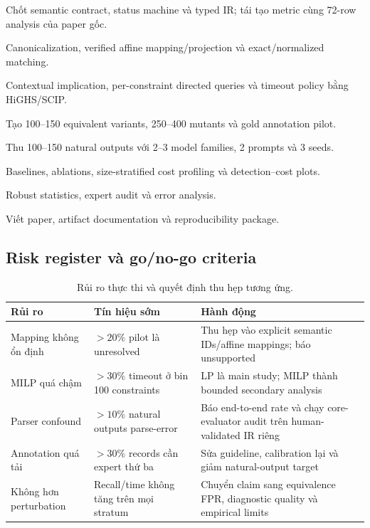 \documentclass[11pt,a4paper]{article}
\begin{document}
\begin{description}[leftmargin=2.3em,labelindent=0em,labelsep=0.5em,style=nextline]
  \item[\textbf{Tuần 1--2.}]
  Chốt semantic contract, status machine và typed IR; tái tạo metric cùng
  72-row analysis của paper gốc.

  \item[\textbf{Tuần 3--4.}]
  Canonicalization, verified affine mapping/projection và exact/normalized
  matching.

  \item[\textbf{Tuần 5--6.}]
  Contextual implication, per-constraint directed queries và timeout policy
  bằng HiGHS/SCIP.

  \item[\textbf{Tuần 7--8.}]
  Tạo 100--150 equivalent variants, 250--400 mutants và gold annotation pilot.

  \item[\textbf{Tuần 9.}]
  Thu 100--150 natural outputs với 2--3 model families, 2 prompts và 3 seeds.

  \item[\textbf{Tuần 10.}]
  Baselines, ablations, size-stratified cost profiling và detection--cost plots.

  \item[\textbf{Tuần 11.}]
  Robust statistics, expert audit và error analysis.

  \item[\textbf{Tuần 12.}]
  Viết paper, artifact documentation và reproducibility package.
\end{description}

\subsection{Risk register và go/no-go criteria}

\begin{table}[htbp]
\centering
\caption{Rủi ro thực thi và quyết định thu hẹp tương ứng.}
\small
\begin{tabularx}{\textwidth}{L{3cm} L{3.1cm} Y}
\toprule
\textbf{Rủi ro} & \textbf{Tín hiệu sớm} & \textbf{Hành động} \\
\midrule
Mapping không ổn định & \(>20\%\) pilot là unresolved & Thu hẹp vào explicit semantic IDs/affine mappings; báo unsupported \\
MILP quá chậm & \(>30\%\) timeout ở bin 100 constraints & LP là main study; MILP thành bounded secondary analysis \\
Parser confound & \(>10\%\) natural outputs parse-error & Báo end-to-end rate và chạy core-evaluator audit trên human-validated IR riêng \\
Annotation quá tải & \(>30\%\) records cần expert thứ ba & Sửa guideline, calibration lại và giảm natural-output target \\
Không hơn perturbation & Recall/time không tăng trên mọi stratum & Chuyển claim sang equivalence FPR, diagnostic quality và empirical limits \\
\bottomrule
\end{tabularx}
\end{table}
\end{document}
